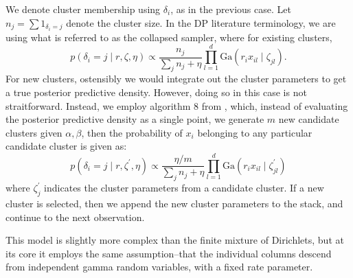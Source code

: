 We denote cluster membership using $\delta_i$, as in the previous case.  Let
  $n_j = \sum 1_{\delta_i = j}$ denote the cluster size.  In the DP literature terminology, we
  are using what is referred to as the collapsed sampler, where for existing clusters,
  \begin{equation}
    p(\delta_i = j \mid r, \zeta, \eta) \propto \frac{n_j}{\sum_j n_j + \eta}
                \prod_{l = 1}^d\text{Ga}(r_ix_{il}\mid\zeta_{jl}).
  \end{equation}
For new clusters, ostensibly we would integrate out the cluster parameters to get a true
  posterior predictive density.  However, doing so in this case is not straitforward.  Instead,
  we employ algorithm 8 from \cite{neal2000}, which, instead of evaluating the posterior predictive
  density as a single point, we generate $m$ new candidate clusters given $\alpha,\beta$, then the
  probability of $x_i$ belonging to any particular candidate cluster is given as:
  \begin{equation}
    p(\delta_i = j \mid r, \zeta^{\prime}, \eta) \propto \frac{\eta / m}{\sum_j n_j + \eta}
                \prod_{l = 1}^d\text{Ga}(r_ix_{il}\mid\zeta_{jl}^{\prime})
  \end{equation}
  where $\zeta_j^{\prime}$ indicates the cluster parameters from a candidate cluster.  If a new
  cluster is selected, then we append the new cluster parameters to the stack, and continue to the
  next observation.

This model is slightly more complex than the finite mixture of Dirichlets, but at its core it
  employs the same assumption--that the individual columns descend from independent gamma random
  variables, with a fixed rate parameter.

